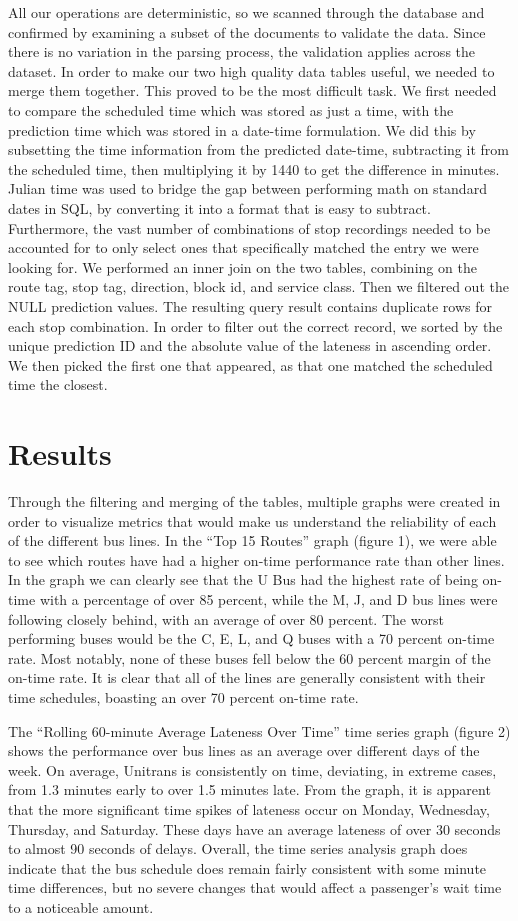 \documentclass[]{article}
\begin{document}
	All our operations are deterministic, so we scanned through the database and confirmed by examining a subset of the documents to validate the data. Since there is no variation in the parsing process, the validation applies across the dataset.
	In order to make our two high quality data tables useful, we needed to merge them together. This proved to be the most difficult task. We first needed to compare the scheduled time which was stored as just a time, with the prediction time which was stored in a date-time formulation. We did this by subsetting the time information from the predicted date-time, subtracting it from the scheduled time, then multiplying it by 1440 to get the difference in minutes. Julian time was used to bridge the gap between performing math on standard dates in SQL, by converting it into a format that is easy to subtract. Furthermore, the vast number of combinations of stop recordings needed to be accounted for to only select ones that specifically matched the entry we were looking for. We performed an inner join on the two tables, combining on the route tag, stop tag, direction, block id, and service class. Then we filtered out the NULL prediction values. The resulting query result contains duplicate rows for each stop combination. In order to filter out the correct record, we sorted by the unique prediction ID and the absolute value of the lateness in ascending order. We then picked the first one that appeared, as that one matched the scheduled time the closest. 
	\section{Results}
	Through the filtering and merging of the tables, multiple graphs were created in order to visualize metrics that would make us understand the reliability of each of the different bus lines. In the “Top 15 Routes” graph (figure 1), we were able to see which routes have had a higher on-time performance rate than other lines. In the graph we can clearly see that the U Bus had the highest rate of being on-time with a percentage of over 85 percent, while the M, J, and D bus lines were following closely behind, with an average of over 80 percent. The worst performing buses would be the C, E, L, and Q buses with a 70 percent on-time rate. Most notably, none of these buses fell below the 60 percent margin of the on-time rate. It is clear that all of the lines are generally consistent with their time schedules, boasting an over 70 percent on-time rate.
	
	The “Rolling 60-minute Average Lateness Over Time” time series graph (figure 2) shows the performance over bus lines as an average over different days of the week. On average, Unitrans is consistently on time, deviating, in extreme cases, from 1.3 minutes early to over 1.5 minutes late. From the graph, it is apparent that the more significant time spikes of lateness occur on Monday, Wednesday, Thursday, and Saturday. These days have an average lateness of over 30 seconds to almost 90 seconds of delays. Overall, the time series analysis graph does indicate that the bus schedule does remain fairly consistent with some minute time differences, but no severe changes that would affect a passenger’s wait time to a noticeable amount.
	
\end{document}
